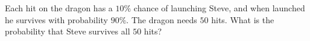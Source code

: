 Each hit on the dragon has a $10\%$ chance of launching Steve, and when launched he survives with probability $90\%$. The dragon needs $50$ hits. What is the probability that Steve survives all $50$ hits?
